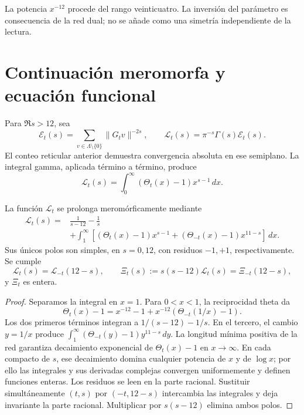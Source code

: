 La potencia \(x^{-12}\) procede del rango veinticuatro. La inversión del parámetro es consecuencia de la red dual; no se añade como una simetría independiente de la lectura.

\section{Continuación meromorfa y ecuación funcional}

Para \(\Re s>12\), sea
\begin{equation}
 \mathcal E_t(s)=\sum_{v\in\Lambda\setminus\{0\}}\|G_tv\|^{-2s},
 \qquad \mathcal L_t(s)=\pi^{-s}\Gamma(s)\mathcal E_t(s).
 \label{x_reciprocidad:rec:eq:epstein}
\end{equation}
El conteo reticular anterior demuestra convergencia absoluta en ese semiplano. La integral gamma, aplicada término a término, produce
\[
 \mathcal L_t(s)=\int_0^\infty(\Theta_t(x)-1)x^{s-1}\,dx.
\]

\begin{theorem}
\label{x_reciprocidad:rec:thm:mellin}
La función \(\mathcal L_t\) se prolonga meromórficamente mediante
\begin{align}
 \mathcal L_t(s)={}&\frac1{s-12}-\frac1s\nonumber\\
 &+\int_1^\infty\left[(\Theta_t(x)-1)x^{s-1}
                 +(\Theta_{-t}(x)-1)x^{11-s}\right]\,dx.
 \label{x_reciprocidad:rec:eq:mellin-partida}
\end{align}
Sus únicos polos son simples, en \(s=0,12\), con residuos \(-1,+1\), respectivamente. Se cumple
\begin{equation}
 \mathcal L_t(s)=\mathcal L_{-t}(12-s),\qquad
 \Xi_t(s):=s(s-12)\mathcal L_t(s)=\Xi_{-t}(12-s),
 \label{x_reciprocidad:rec:eq:funcional}
\end{equation}
y \(\Xi_t\) es entera.
\end{theorem}
\begin{proof}
Separamos la integral en \(x=1\). Para \(0<x<1\), la reciprocidad theta da
\[
 \Theta_t(x)-1=x^{-12}-1+x^{-12}(\Theta_{-t}(1/x)-1).
\]
Los dos primeros términos integran a \(1/(s-12)-1/s\). En el tercero, el cambio \(y=1/x\) produce
\(\int_1^\infty(\Theta_{-t}(y)-1)y^{11-s}\,dy\).
La longitud mínima positiva de la red garantiza decaimiento exponencial de \(\Theta_t(x)-1\) en \(x\to\infty\). En cada compacto de \(s\), ese decaimiento domina cualquier potencia de \(x\) y de \(\log x\); por ello las integrales y sus derivadas complejas convergen uniformemente y definen funciones enteras. Los residuos se leen en la parte racional. Sustituir simultáneamente \((t,s)\) por \((-t,12-s)\) intercambia las integrales y deja invariante la parte racional. Multiplicar por \(s(s-12)\) elimina ambos polos.
\end{proof}

